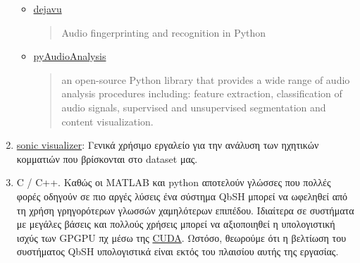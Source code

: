 \begin{enumerate}
\begin{itemize}
        \item \href{https://github.com/worldveil/dejavu}{dejavu}
        \blockquote{Audio fingerprinting and recognition in Python}

        \item \href{https://github.com/tyiannak/pyAudioAnalysis}{pyAudioAnalysis}
        \blockquote{an open-source Python library that provides a wide range of audio analysis procedures including: feature extraction, classification of audio signals, supervised and unsupervised segmentation and content visualization.}
    \end{itemize}

    \item \href{http://sonicvisualiser.org/}{sonic visualizer}:
    Γενικά χρήσιμο εργαλείο για την ανάλυση των ηχητικών κομματιών που βρίσκονται στο dataset μας.

    \item C / C++.
    Καθώς οι MATLAB και python αποτελούν γλώσσες που πολλές φορές οδηγούν σε πιο αργές λύσεις ένα σύστημα QbSH μπορεί να ωφεληθεί από τη χρήση γρηγορότερων γλωσσών χαμηλότερων επιπέδου.
    Ιδιαίτερα σε συστήματα με μεγάλες βάσεις και πολλούς χρήσεις μπορεί να αξιοποιηθεί η υπολογιστική ισχύς των GPGPU πχ μέσω της
    \href{http://www.nvidia.com/object/cuda_home_new.html}{CUDA}.
    Ωστόσο, θεωρούμε ότι η βελτίωση του συστήματος QbSH υπολογιστικά είναι εκτός του πλαισίου αυτής της εργασίας.
\end{enumerate}
